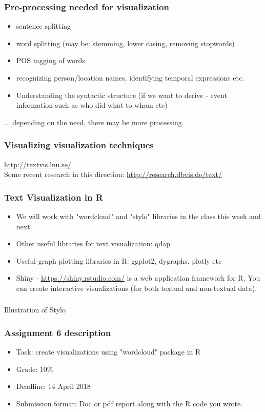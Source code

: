 \documentclass{beamer}
\begin{document}
\begin{frame}
\frametitle{Pre-processing needed for visualization}
\begin{itemize}
\item sentence splitting
\item word splitting (may be: stemming, lower casing, removing stopwords)
\item POS tagging of words
\item recognizing person/location names, identifying temporal expressions etc.
\item Understanding the syntactic structure (if we want to derive - event information such as who did what to whom etc)
\end{itemize}
... depending on the need, there may be more processing.
\end{frame}

\begin{frame}
\frametitle{Visualizing visualization techniques}
\url{http://textvis.lnu.se/}
\\ Some recent research in this direction: \url{http://research.dbvis.de/text/}
\end{frame}

\begin{frame}
\frametitle{Text Visualization in R}
\begin{itemize}
\item We will work with "wordcloud" and "stylo" libraries in the class this week and next.
\item Other useful libraries for text visualization: qdap
\item Useful graph plotting libraries in R: ggplot2, dygraphs, plotly etc
\item Shiny - \url{https://shiny.rstudio.com/} is a web application framework for R. You can create interactive visualizations (for both textual and non-textual data).
\end{itemize}
\end{frame}

\begin{frame}
\frametitle{}
\centering
\Large Illustration of Stylo
\end{frame}

\begin{frame}
\frametitle{Assignment 6 description}
\begin{itemize}
\item Task: create visualizations using "wordcloud" package in R
\item Grade: 10\%
\item Deadline: 14 April 2018
\item Submission format: Doc or pdf report along with the R code you wrote.
\end{itemize}
\end{frame}
\end{document}
